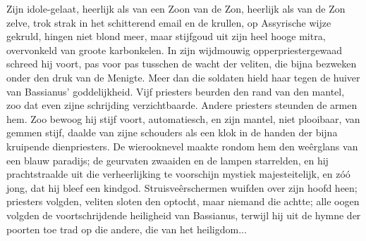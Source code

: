 \documentclass[a4paper, 12pt, oneside, dutch]{article}
\begin{document}
Zijn idole-gelaat, heerlijk als van een Zoon van de Zon, heerlijk als van de Zon zelve, trok strak in het schitterend email en de krullen, op Assyrische wijze gekruld, hingen niet blond meer, maar stijfgoud uit zijn heel hooge mitra, overvonkeld van groote karbonkelen. In zijn wijdmouwig opperpriestergewaad schreed hij voort, pas voor pas tusschen de wacht der veliten, die bijna bezweken onder den druk van de Menigte. Meer dan die soldaten hield haar tegen de huiver van Bassianus' goddelijkheid. Vijf priesters beurden den rand van den mantel, zoo dat even zijne schrijding verzichtbaarde. Andere priesters steunden de armen hem. Zoo bewoog hij stijf voort, automatiesch, en zijn mantel, niet plooibaar, van gemmen stijf, daalde van zijne schouders als een klok in de handen der bijna kruipende dienpriesters. De wierooknevel maakte rondom hem den weêrglans van een blauw paradijs; de geurvaten zwaaiden en de lampen starrelden, en hij prachtstraalde uit die verheerlijking te voorschijn mystiek majesteitelijk, en zóó jong, dat hij bleef een kindgod. Struisveêrschermen wuifden over zijn hoofd heen; priesters volgden, veliten sloten den optocht, maar niemand die achtte; alle oogen volgden de voortschrijdende heiligheid van Bassianus, terwijl hij uit de hymne der poorten toe trad op die andere, die van het heiligdom...
\end{document}
